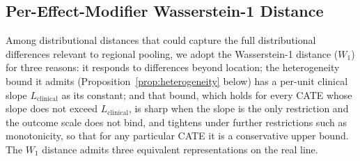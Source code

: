 \documentclass[AMA,Times1COL]{WileyNJDv5}
\begin{document}
\subsection{Per-Effect-Modifier Wasserstein-1 Distance}\label{sec:nabcd_metric}

Among distributional distances that could capture the full distributional differences relevant to regional pooling, we adopt the Wasserstein-1 distance ($W_1$) for three reasons: it responds to differences beyond location; the heterogeneity bound it admits (Proposition~\ref{prop:heterogeneity} below) has a per-unit clinical slope $L_{\text{clinical}}$ as its constant; and that bound, which holds for every CATE whose slope does not exceed $L_{\text{clinical}}$, is sharp when the slope is the only restriction and the outcome scale does not bind, and tightens under further restrictions such as monotonicity, so that for any particular CATE it is a conservative upper bound. The $W_1$ distance admits three equivalent representations on the real line.\cite{panaretos2019}
\end{document}
